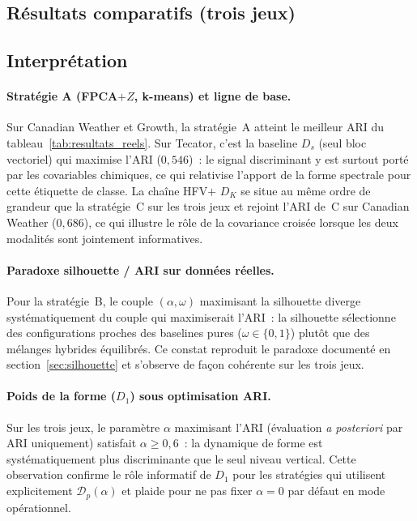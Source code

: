 \documentclass[11pt,a4paper]{article}
\newcommand{\DK}{D_K}
\begin{document}
\subsection{Résultats comparatifs (trois jeux)}



\subsection{Interprétation}

\paragraph{Stratégie A (FPCA$+Z$, k-means) et ligne de base.}
Sur Canadian Weather et Growth, la stratégie~A atteint le meilleur ARI du
tableau~\ref{tab:resultats_reels}. Sur Tecator, c'est la baseline $D_s$
(seul bloc vectoriel) qui maximise l'ARI ($0{,}546$)~: le signal discriminant
y est surtout porté par les covariables chimiques, ce qui relativise
l'apport de la forme spectrale pour cette étiquette de classe. La chaîne
HFV$+$ $\DK$ se situe au même ordre de grandeur que la stratégie~C sur les
trois jeux et rejoint l'ARI de~C sur Canadian Weather ($0{,}686$), ce qui
illustre le rôle de la covariance croisée lorsque les deux modalités sont
jointement informatives.

\paragraph{Paradoxe silhouette / ARI sur données réelles.}
Pour la stratégie~B, le couple $(\alpha,\omega)$ maximisant la silhouette
diverge systématiquement du couple qui maximiserait l'ARI~: la silhouette
sélectionne des configurations proches des baselines pures ($\omega \in \{0,1\}$)
plutôt que des mélanges hybrides équilibrés. Ce constat reproduit le paradoxe
documenté en section~\ref{sec:silhouette} et s'observe de façon cohérente sur les trois jeux.

\paragraph{Poids de la forme ($D_1$) sous optimisation ARI.}
Sur les trois jeux, le paramètre $\alpha$ maximisant l'ARI (évaluation \emph{a
posteriori} par ARI uniquement) satisfait $\alpha \geq 0{,}6$~: la dynamique de forme est
systématiquement plus discriminante que le seul niveau vertical. Cette
observation confirme le rôle informatif de $D_1$ pour les stratégies qui
utilisent explicitement $\mathcal{D}_p(\alpha)$ et plaide pour ne pas fixer
$\alpha = 0$ par défaut en mode opérationnel.
\end{document}
